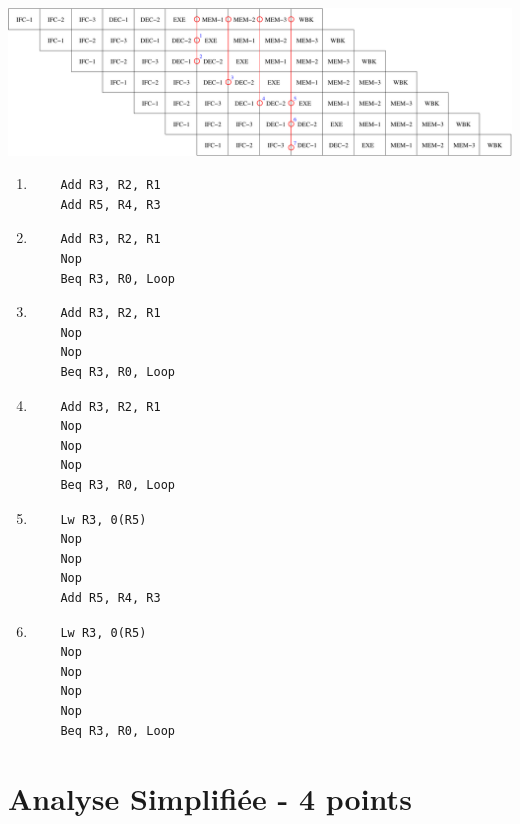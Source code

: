 \begin{correction}

  \begin{center}
    \includegraphics[scale=0.6]{figures/correction-bypasses.pdf}
  \end{center}

  \begin{enumerate}
    \item
      \begin{verbatim}
	Add R3, R2, R1
	Add R5, R4, R3
      \end{verbatim}
    \item
      \begin{verbatim}
	Add R3, R2, R1
	Nop
	Beq R3, R0, Loop
      \end{verbatim}
    \item
      \begin{verbatim}
	Add R3, R2, R1
	Nop
	Nop
	Beq R3, R0, Loop
      \end{verbatim}
    \item
      \begin{verbatim}
	Add R3, R2, R1
	Nop
	Nop
	Nop
	Beq R3, R0, Loop
      \end{verbatim}
    \item
      \begin{verbatim}
	Lw R3, 0(R5)
	Nop
	Nop
	Nop
	Add R5, R4, R3
      \end{verbatim}
    \item
      \begin{verbatim}
	Lw R3, 0(R5)
	Nop
	Nop
	Nop
	Nop
	Beq R3, R0, Loop
      \end{verbatim}
  \end{enumerate}

\end{correction}

%
%

\section{Analyse Simplifi\'ee - 4 points}

